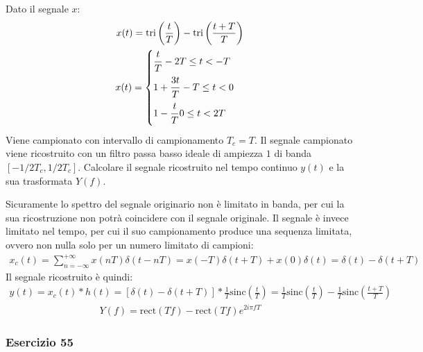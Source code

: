 \documentclass{article}
\newcommand{\rect}{\mathrm{rect}}
\newcommand{\sinc}{\mathrm{sinc}}
\newcommand{\tri}{\mathrm{tri}}
\begin{document}
Dato il segnale $x$:
\begin{gather*}
    x(t)=\tri \left(\displaystyle\frac{t}{T}\right)-\tri \left(\frac{t+T}{T}\right)\\
    x(t)=\begin{cases}
        \displaystyle\frac{\strut t}{\strut T} -2T\leq t<-T\\
        1+\displaystyle\frac{\strut 3t}{\strut T} -T\leq t<0\\
        1-\displaystyle\frac{\strut t}{\strut T} 0\leq t<2T
    \end{cases}
\end{gather*}
Viene campionato con intervallo di campionamento $T_c=T$. Il segnale campionato viene ricostruito con un filtro passa basso ideale di ampiezza $1$ di banda $[-1/2T_c,1/2T_c]$. 
Calcolare il segnale ricostruito nel tempo continuo $y(t)$ e la sua trasformata $Y(f)$. 

Sicuramente lo spettro del segnale originario non è limitato in banda, per cui la sua ricostruzione non potrà coincidere con il segnale originale. Il segnale è invece limitato 
nel tempo, per cui il suo campionamento produce una sequenza limitata, ovvero non nulla solo per un numero limitato di campioni:
\begin{gather*}
    x_c(t)=\displaystyle\sum_{n=-\infty}^{+\infty}x(nT)\delta(t-nT)=x(-T)\delta(t+T)+x(0)\delta(t)=\delta(t)-\delta(t+T)
\end{gather*}
Il segnale ricostruito è quindi:
\begin{gather*}
    y(t)=x_c(t)*h(t)=\left[\delta(t)-\delta(t+T)\right]*\frac{1}{T}\sinc\left(\frac{t}{T}\right)=\frac{1}{T}\sinc\left(\frac{t}{T}\right)-\frac{1}{T}\sinc\left(\frac{t+T}{T}\right)
\end{gather*}
\begin{gather}
    Y(f)=\rect(Tf)-\rect(Tf)e^{2i\pi fT}
\end{gather}

\subsubsection*{Esercizio 55}
\end{document}
